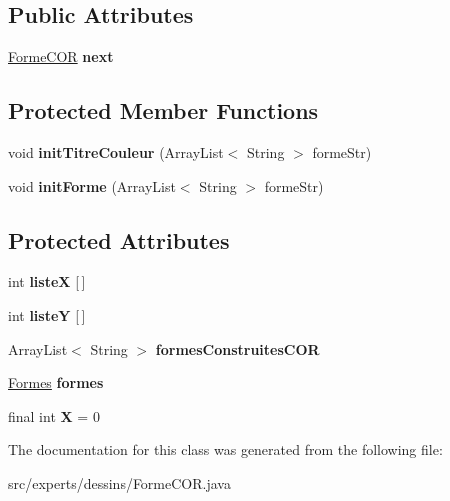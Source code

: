 \subsection*{Public Attributes}
\begin{DoxyCompactItemize}
\item 
\mbox{\label{classexperts_1_1dessins_1_1_forme_c_o_r_a33412da0c483de0c5099b25d280b5e31}} 
\mbox{\hyperlink{classexperts_1_1dessins_1_1_forme_c_o_r}{Forme\+C\+OR}} {\bfseries next}
\end{DoxyCompactItemize}
\subsection*{Protected Member Functions}
\begin{DoxyCompactItemize}
\item 
\mbox{\label{classexperts_1_1dessins_1_1_forme_c_o_r_a3d7bd2fd026071683937f8276fd0dba6}} 
void {\bfseries init\+Titre\+Couleur} (Array\+List$<$ String $>$ forme\+Str)
\item 
\mbox{\label{classexperts_1_1dessins_1_1_forme_c_o_r_ad74714c38de50399a97dc4c37d524331}} 
void {\bfseries init\+Forme} (Array\+List$<$ String $>$ forme\+Str)
\end{DoxyCompactItemize}
\subsection*{Protected Attributes}
\begin{DoxyCompactItemize}
\item 
\mbox{\label{classexperts_1_1dessins_1_1_forme_c_o_r_a8c8627662ea50a7887914fc44989859e}} 
int {\bfseries listeX} \mbox{[}$\,$\mbox{]}
\item 
\mbox{\label{classexperts_1_1dessins_1_1_forme_c_o_r_ab36555d5dd64e6024c40abda90153520}} 
int {\bfseries listeY} \mbox{[}$\,$\mbox{]}
\item 
\mbox{\label{classexperts_1_1dessins_1_1_forme_c_o_r_ae96cc561daca87d2f695e998363235ae}} 
Array\+List$<$ String $>$ {\bfseries formes\+Construites\+C\+OR}
\item 
\mbox{\label{classexperts_1_1dessins_1_1_forme_c_o_r_a5d99af904eef76d0a5cadca8880e5b6f}} 
\mbox{\hyperlink{classdessin_1_1_formes}{Formes}} {\bfseries formes}
\item 
\mbox{\label{classexperts_1_1dessins_1_1_forme_c_o_r_a85718c06af8e9774e2a0268b74dc4089}} 
final int {\bfseries X} = 0
\end{DoxyCompactItemize}


The documentation for this class was generated from the following file\+:\begin{DoxyCompactItemize}
\item 
src/experts/dessins/Forme\+C\+O\+R.\+java\end{DoxyCompactItemize}

